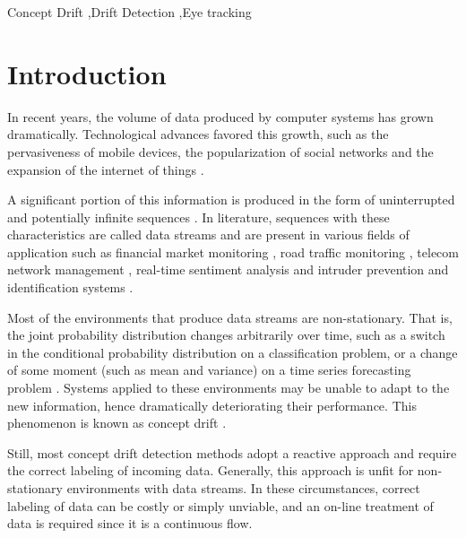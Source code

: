 \documentclass[preprint,12pt]{elsarticle}
\begin{document}
\begin{frontmatter}
\begin{keyword}
Concept Drift \sep Drift Detection \sep Eye tracking
\end{keyword}

\end{frontmatter}

\linenumbers

\section{Introduction}
\label{sec:intro}

In recent years,
the volume of data produced by computer systems has grown dramatically.
Technological advances favored this growth,
such as the pervasiveness of mobile devices,
the popularization of social networks and
the expansion of the internet of things \cite{Cohen:BigData:2009:MSN:1687553.1687576}.

A significant portion of this information is produced in the form of uninterrupted and potentially infinite sequences \cite{Aggarwal:2006:DSM:1196418}.
In literature,
sequences with these characteristics are called data streams and
are present in various fields of application such as
financial market monitoring  \cite{ZHOU:2015},
road traffic monitoring \cite{Wang:2015:EOV:2843092.2843464},
telecom network management \cite{delattre2015method},
real-time sentiment analysis  \cite{KRANJC2015187}
and intruder prevention and identification systems \cite{KENKRE:PAI:COLACO:2015}.

Most of the environments that produce data streams are non-stationary.
That is,
the joint probability distribution changes arbitrarily over time,
such as a switch in the conditional probability distribution on a classification problem,
or a change of some moment (such as mean and variance) on a time series forecasting problem \cite{tsymbal2004problem}.
Systems applied to these environments may be unable to adapt to the new information, hence dramatically deteriorating their performance.
This phenomenon is known as concept drift \cite{Gama:2014:DAF:2670967.2670971}.

Still, most concept drift detection methods adopt a reactive approach and require the correct labeling of incoming data.
Generally, this approach is unfit for non-stationary environments with data streams.
In these circumstances,
correct labeling of data can be costly or simply unviable,
and an on-line treatment of data is required since it is a continuous flow.
\end{document}
